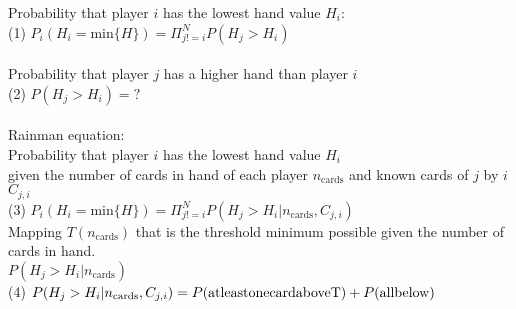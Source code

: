 \documentclass[10pt]{article}
\begin{document}
Probability that player $i$ has the lowest hand value $H_i$:  \\
(1) $P_{i}(H_i = \mathrm{min}\{H\}) = \Pi_{j!=i}^{N} P(H_j > H_i)$
\\ \\
Probability that player $j$ has a higher hand than player $i$  \\
(2) $P(H_j>H_i) = ?$
\\ \\
Rainman equation:\\
Probability that player $i$ has the lowest hand value $H_i$\\ given the number of cards in hand of each player $n_{\mathrm{cards}}$ and known cards of $j$ by $i$ $C_{j,i}$
\\
(3) $P_{i}(H_i = \mathrm{min}\{H\}) = \Pi_{j!=i}^{N} P(H_j > H_i|n_{\mathrm{cards}}, C_{j,i})$
\\
Mapping $T(n_{\mathrm{cards} })$ that is the threshold minimum possible given the number of cards in hand.\\ $P(H_j > H_i|n_{\mathrm{cards}})$
\\
(4) $P(H_j > H_i|n_{\mathrm{cards}}, C_{j,i})=\\ P(\mathrm{at least one card above T}) + P(\mathrm{all below })$ 
\end{document}
